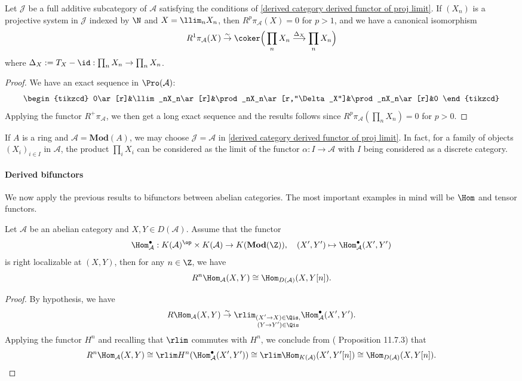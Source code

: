 \begin{corollary}
Let $\mathcal{J}$ be a full additive subcategory of $\mathcal{A}$ satisfying the conditions of \cref{derived category derived functor of proj limit}. If $(X_n)$ is a projective system in $\mathcal{J}$ indexed by $\N$ and $X=\llim_nX_n$, then $R^p\pi_\mathcal{A}(X)=0$ for $p>1$, and we have a canonical isomorphism
\[R^1\pi_\mathcal{A}(X)\stackrel{\sim}{\to} \coker\Big(\prod_nX_n\stackrel{\Delta_X}{\longrightarrow}\prod_nX_n\Big)\]
where $\Delta_X:=T_X-\id:\prod_nX_n\to\prod_nX_n$.
\end{corollary}
\begin{proof}
We have an exact sequence in $\Pro(\mathcal{A})$:
\[\begin{tikzcd}
0\ar[r]&\llim_nX_n\ar[r]&\prod_nX_n\ar[r,"\Delta_X"]&\prod_nX_n\ar[r]&0
\end{tikzcd}\]
Applying the functor $R^+\pi_\mathcal{A}$, we then get a long exact sequence and the results follows since $R^p\pi_\mathcal{A}(\prod_nX_n)=0$ for $p>0$.
\end{proof}

\begin{example}
If $A$ is a ring and $\mathcal{A}=\mathbf{Mod}(A)$, we may choose $\mathcal{J}=\mathcal{A}$ in \cref{derived category derived functor of proj limit}. In fact, for a family of objects $(X_i)_{i\in I}$ in $\mathcal{A}$, the product $\prod_iX_i$ can be considered as the limit of the functor $\alpha:I\to\mathcal{A}$ with $I$ being considered as a discrete category.
\end{example}

\paragraph{Derived bifunctors}
We now apply the previous results to bifunctors between abelian categories. The most important examples in mind will be $\Hom$ and tensor functors.
\begin{theorem}\label{derived category R^0Hom is Hom in D(A)}
Let $\mathcal{A}$ be an abelian category and $X,Y\in D(\mathcal{A})$. Assume that the functor
\[\Hom_\mathcal{A}^\bullet:K(\mathcal{A})^{\op}\times K(\mathcal{A})\to K(\mathbf{Mod}(\Z)),\quad (X',Y')\mapsto \Hom_\mathcal{A}^{\bullet}(X',Y')\]
is right localizable at $(X,Y)$, then for any $n\in\Z$, we have
\[R^n\Hom_\mathcal{A}(X,Y)\cong\Hom_{D(\mathcal{A})}(X,Y[n]).\]
\end{theorem}
\begin{proof}
By hypothesis, we have
\[R\Hom_\mathcal{A}(X,Y)\stackrel{\sim}{\to} \rlim_{\substack{(X'\to X)\in\Qis,\\(Y\to Y')\in\Qis}}\Hom_\mathcal{A}^\bullet(X',Y').\]
Applying the functor $H^n$ and recalling that $\rlim$ commutes with $H^n$, we conclude from (\cite{kashiwara_SAC} Proposition 11.7.3) that
\begin{equation*}
R^n\Hom_\mathcal{A}(X,Y)\cong \rlim H^n(\Hom_\mathcal{A}^\bullet(X',Y'))\cong \rlim \Hom_{K(\mathcal{A})}(X',Y'[n])\cong\Hom_{D(\mathcal{A})}(X,Y[n]).\qedhere
\end{equation*}
\end{proof}

